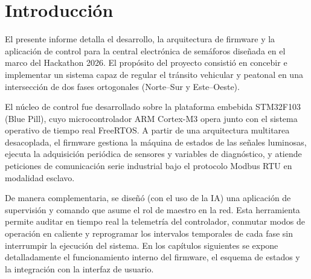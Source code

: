 \chapter{Introducción}
\label{sec:introduccion}

El presente informe detalla el desarrollo, la arquitectura de firmware y la aplicación de control para la central
electrónica de semáforos diseñada en el marco del Hackathon 2026. El propósito del proyecto consistió en concebir e
implementar un sistema capaz de regular el tránsito vehicular y peatonal en una intersección de dos fases
ortogonales (Norte--Sur y Este--Oeste).

El núcleo de control fue desarrollado sobre la plataforma embebida STM32F103 (Blue Pill), cuyo microcontrolador
ARM Cortex-M3 opera junto con el sistema operativo de tiempo real FreeRTOS. A partir de una arquitectura multitarea
desacoplada, el firmware gestiona la máquina de estados de las señales luminosas, ejecuta la adquisición periódica de
sensores y variables de diagnóstico, y atiende peticiones de comunicación serie industrial bajo el protocolo Modbus RTU
en modalidad esclavo.

De manera complementaria, se diseñó (con el uso de la IA) una aplicación de supervisión y comando que asume el rol de
maestro en la red.  Esta herramienta permite auditar en tiempo real la telemetría del controlador, conmutar modos de
operación en caliente y reprogramar los intervalos temporales de cada fase sin interrumpir la ejecución del sistema. En
los capítulos siguientes se expone detalladamente el funcionamiento interno del firmware, el esquema de estados y la
integración con la interfaz de usuario.
